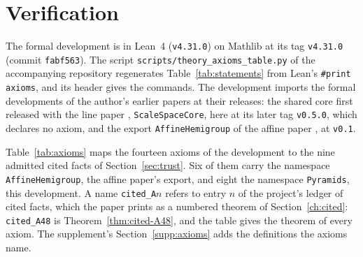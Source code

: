\section{Verification}
\label{app:verification}

The formal development is in Lean~4 (\texttt{v4.31.0}) on Mathlib at its tag \texttt{v4.31.0}
(commit \texttt{fabf563}). The script \texttt{scripts/theory\_axioms\_table.py} of the
accompanying repository regenerates Table~\ref{tab:statements} from Lean's \texttt{\#print
axioms}, and its header gives the commands.
The development imports the formal
developments of the author's earlier papers at their releases: the shared core first released with
the line paper , \texttt{ScaleSpaceCore}, here at its later tag
\texttt{v0.5.0}, which declares no axiom, and
the export \texttt{AffineHemigroup} of the affine paper , at \texttt{v0.1}.

Table~\ref{tab:axioms} maps the fourteen axioms of the development to the nine admitted cited
facts of Section~\ref{sec:trust}. Six of them carry the namespace \texttt{AffineHemigroup}, the
affine paper's export, and eight the namespace \texttt{Pyramids}, this development. A name
\texttt{cited\_A}$n$ refers to entry $n$ of the project's ledger of cited facts, which the paper
prints as a numbered theorem of Section~\ref{ch:cited}: \texttt{cited\_A48} is
Theorem~\ref{thm:cited-A48}, and the table gives the theorem of every axiom. The supplement's
Section~\ref{supp:axioms} adds the definitions the axioms name.

